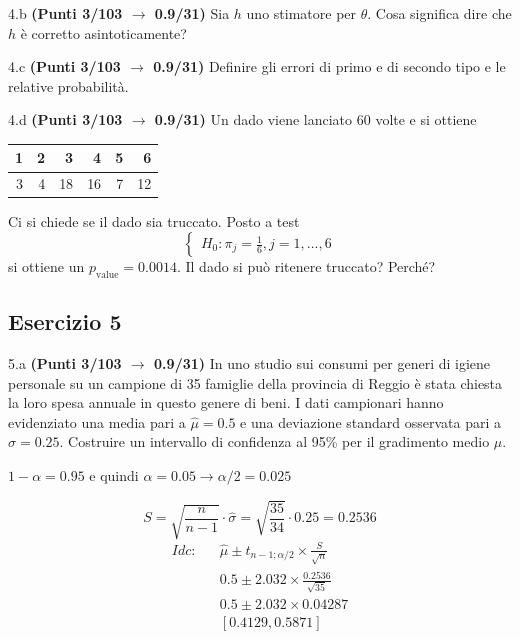 \documentclass[
  11pt,
]{book}
\theoremstyle{mytheoremstyle}
\theoremstyle{mydefstyle}
\newenvironment{sol}
  {
  \begin{tcolorbox}[enhanced,breakable,arc=0.1mm,boxrule=1pt,colback=white,colframe=iblue,
  title=\bf \fontfamily{lmss}\selectfont \hspace{.5 cm} Soluzione,drop fuzzy shadow]

}{
\end{tcolorbox}
  }
\begin{document}
4.b \textbf{(Punti 3/103 \(\rightarrow\) 0.9/31)} Sia \(h\) uno stimatore per \(\theta\). Cosa significa dire che \(h\) è corretto asintoticamente?

4.c \textbf{(Punti 3/103 \(\rightarrow\) 0.9/31)} Definire gli errori di primo e di secondo tipo e le relative probabilità.

4.d \textbf{(Punti 3/103 \(\rightarrow\) 0.9/31)} Un dado viene lanciato 60 volte e si ottiene

\begin{table}[H]
\centering
\begin{tabular}{rrrrrr}
\toprule
1 & 2 & 3 & 4 & 5 & 6\\
\midrule
3 & 4 & 18 & 16 & 7 & 12\\
\bottomrule
\end{tabular}
\end{table}

Ci si chiede se il dado sia truccato. Posto a test
\[
\begin{cases}
H_0:\pi_j=\frac 16, j = 1,...,6
\end{cases}
\]
si ottiene un \(p_{\text{value}}=0.0014\). Il dado si può ritenere truccato? Perché?

\subsection{Esercizio 5}\label{esercizio-5-25}

5.a \textbf{(Punti 3/103 \(\rightarrow\) 0.9/31)} In uno studio sui consumi per generi di igiene personale su un campione di 35 famiglie della provincia di Reggio è stata chiesta la loro spesa annuale in questo genere di beni. I dati campionari hanno evidenziato una media pari a \(\hat\mu=0.5\) e una deviazione standard osservata pari a \(\hat\sigma=0.25\).
Costruire un intervallo di confidenza al 95\% per il gradimento medio \(\mu\).

\begin{sol}
\(1-\alpha =0.95\) e quindi \(\alpha=0.05\rightarrow \alpha/2=0.025\)

\[
      S  =\sqrt{\frac {n}{n-1}}\cdot\hat\sigma =
     \sqrt{\frac { 35 }{ 34 }}\cdot 0.25 = 0.2536 
\]
\begin{eqnarray*}
  Idc: & &  \hat\mu \pm  t_{n-1;\alpha/2} \times \frac{S}{\sqrt{n}} \\
     & &  0.5 \pm  2.032 \times \frac{ 0.2536 }{\sqrt{ 35 }} \\
     & &  0.5 \pm  2.032 \times  0.04287 \\
     & & [ 0.4129 ,  0.5871 ]
\end{eqnarray*}

\end{sol}
\end{document}

